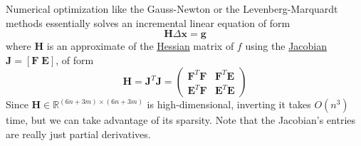 \documentclass{article}
\begin{document}
  Numerical optimization like the Gauss-Newton or the Levenberg-Marquardt methods essentially solves an incremental linear equation of form 
  \begin{equation}
    \mathbf{H} \Delta \mathbf{x} = \mathbf{g}
  \end{equation}
  where $\mathbf{H}$ is an approximate of the \hyperref[mv-def:hessian]{Hessian} matrix of $f$ using the \hyperref[mv-def:jacobian]{Jacobian} $\mathbf{J} = [ \mathbf{F}\; \mathbf{E}]$, of form 
  \begin{equation}
    \mathbf{H} = \mathbf{J}^T \mathbf{J} = \begin{pmatrix}
      \mathbf{F}^T \mathbf{F} & \mathbf{F}^T \mathbf{E} \\ \mathbf{E}^T \mathbf{F} & \mathbf{E}^T \mathbf{E} \end{pmatrix}
  \end{equation}
  Since $\mathbf{H} \in \mathbb{R}^{(6n + 3m) \times (6n + 3m)}$ is high-dimensional, inverting it takes $O(n^3)$ time, but we can take advantage of its sparsity. Note that the Jacobian's entries are really just partial derivatives. 
\end{document}
